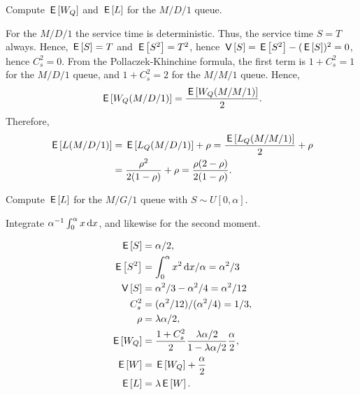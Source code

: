 \begin{extra}
  Compute $\,\mathsf{E}\left[W_Q\right]$ and $\,\mathsf{E}\left[L\right]$ for the $M/D/1$ queue.
\begin{solution}
  For the $M/D/1$ the service time is deterministic.
  Thus, the service time $S=T$ always.
  Hence, $\,\mathsf{E}\left[S\right] = T$ and $\,\mathsf{E}\left[S^2\right]=T^2$, hence $\,\mathsf{V}\left[S\right] = \,\mathsf{E}\left[S^2\right] - (\,\mathsf{E}\left[S\right])^2 = 0$, hence $C_s^2 = 0$.
  From the Pollaczek-Khinchine formula, the first term is $1+C_s^2=1$ for the $M/D/1$ queue, and $1+C_s^2=2$ for the $M/M/1$ queue.
  Hence,
  \begin{equation*}
\,\mathsf{E}\left[W_Q(M/D/1)\right] = \frac{\,\mathsf{E}\left[W_Q(M/M/1)\right]}2.
\end{equation*}
Therefore,
\begin{align*}
 \,\mathsf{E}\left[L(M/D/1)\right] &= \,\mathsf{E}\left[L_Q(M/D/1)\right] +\rho = \frac{\,\mathsf{E}\left[L_Q(M/M/1)\right]}2 + \rho \\
&= \frac{\rho^2}{2(1-\rho)} + \rho=\frac{\rho(2-\rho)} {2(1-\rho)}.
\end{align*}
\end{solution}
\end{extra}

\begin{extra}
  Compute $\,\mathsf{E}\left[L\right]$ for the $M/G/1$ queue with $S\sim U[0,\alpha]$.
  \begin{hint}
Integrate $\alpha^{-1} \int_0^\alpha x \,\text{d}x$, and likewise for the second moment.
  \end{hint}
\begin{solution}
  \begin{align*}
\,\mathsf{E}\left[S\right] &= \alpha/2,\\
\,\mathsf{E}\left[S^2\right] &= \int_0^\alpha x^2 \,\text{d}x/\alpha = \alpha^2/3\\
\,\mathsf{V}\left[S\right] &= \alpha^2/3 - \alpha^2/4= \alpha^2/12\\
C_s^2 &= (\alpha^2/12)/(\alpha^2/4) = 1/3,\\
\rho &= \lambda \alpha/2,\\
\,\mathsf{E}\left[W_Q\right] &= \frac{1+C_s^2}2 \frac{\lambda \alpha/2}{1-\lambda \alpha/2}\frac \alpha2, \\
\,\mathsf{E}\left[W\right] &= \,\mathsf{E}\left[W_Q\right] + \frac \alpha2\\
\,\mathsf{E}\left[L\right] &= \lambda \,\mathsf{E}\left[W\right].
  \end{align*}
\end{solution}
\end{extra}

